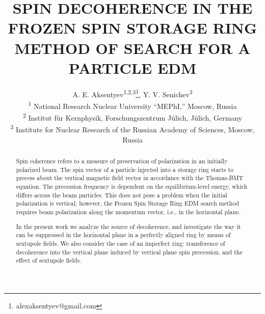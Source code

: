 \documentclass[a4paper]{jacow}
\begin{document}
\title{SPIN DECOHERENCE IN THE FROZEN SPIN STORAGE RING METHOD OF SEARCH FOR A PARTICLE EDM}
\author{A. E. Aksentyev\textsuperscript{1,2,3}\thanks{alexaksentyev@gmail.com},
  Y. V. Senichev\textsuperscript{3} \\
  \textsuperscript{1} National Research Nuclear University ``MEPhI,'' Moscow, Russia \\
  \textsuperscript{2} Institut f\"ur Kernphysik, Forschungszentrum J\"ulich, J\"ulich, Germany\\
  \textsuperscript{3} Institute for Nuclear Research of the Russian Academy of Sciences, Moscow, Russia}
\maketitle

\begin{abstract}
  Spin coherence refers to a measure of preservation of polarization in an initially polarized beam.
  The spin vector of a particle injected into a storage ring starts to precess about
  the vertical magnetic field vector in accordance with the Thomas-BMT equation. The precession frequency
  is dependent on the equilibrium-level energy, which differs across the beam particles.
  This does not pose a problem when the initial polarization is vertical; however,
  the Frozen Spin Storage Ring EDM search method requires beam polarization along the momentum vector,
  i.e., in the horizontal plane. 
  
  In the present work we analyze the source of decoherence, and investigate the way it can be suppressed
  in the horizontal plane in a perfectly aligned ring by means of sextupole fields. We also consider
  the case of an imperfect ring: transference of decoherence into the vertical plane induced by vertical
  plane spin precession, and the effect of sextupole fields.
\end{abstract}
\end{document}
